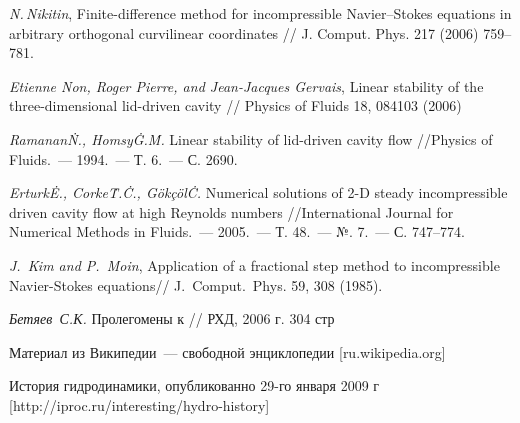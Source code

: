 \newpage

\begin{thebibliography}{99}


  \textit{N.\,Nikitin}, Finite-difference method for incompressible Navier–Stokes equations in 
  arbitrary orthogonal curvilinear coordinates // J. Comput. Phys. 217 (2006) 759–781.

  \textit{Etienne Non, Roger Pierre, and Jean-Jacques Gervais}, Linear stability of the 
  three-dimensional lid-driven cavity // Physics of Fluids 18, 084103 (2006)
  
   \textit{Ramanan\.N., Homsy\.G.\.M.} Linear stability of lid-driven cavity flow 
  //Physics of Fluids.~--- 1994.~--- Т. 6.~--- С. 2690.
  
   \textit{Erturk\.E., Corke\.T.\.C., Gökçöl\.C.} Numerical solutions of 2-D steady incompressible
  driven cavity flow at high Reynolds numbers //International Journal for Numerical Methods in 
  Fluids.~--- 2005.~--- Т. 48.~--- №. 7.~--- С. 747--774.

	\textit{J.~Kim and P.~Moin}, Application of a fractional step method to incompressible Navier-Stokes equations//
 J.~Comput.~Phys. 59, 308 (1985).

   \textit{Бетяев~С.К.} Пролегомены к // РХД, 2006 г. 304 стр
  
   Материал из Википедии~--- свободной энциклопедии [ru.wikipedia.org]

   История гидродинамики, опубликованно 29-го января 2009 г [http://iproc.ru/interesting/hydro-history]

\end{thebibliography}
